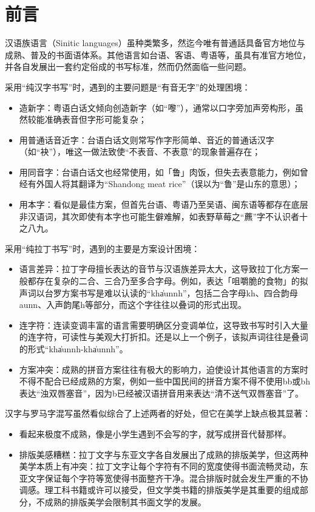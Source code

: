\section*{前言}
汉语族语言（Sinitic languages）虽种类繁多，然迄今唯有普通話具备官方地位与成熟、普及的书面语体系。其他语言如台语、客语、粤语等，虽具有准官方地位，并各自发展出一套约定俗成的书写标准，然而仍然面临一些问题。\par
采用“纯汉字书写”时，遇到的主要问题是“有音无字”的处理困境：\par
\begin{itemize}
	\item 造新字：粤语白话文倾向创造新字（如“嚟”），通常以口字旁加声旁构形，虽然较能准确表音但字形可能复杂；
	\item 用普通话音近字：台语白话文则常写作字形简单、音近的普通话汉字（如“袂”），唯这一做法致使“不表音、不表意”的现象普遍存在；
	\item 用同音字：台语白话文也经常使用，如「鲁」肉饭，但失去表意能力，例如曾经有外国人将其翻译为“Shandong meat rice”（误以为“鲁”是山东的意思）；
	\item 用本字：看似是最佳方案，但首先台语、粤语乃至吴语、闽东语等都存在底层非汉语词，其次即使有本字也可能生僻难解，如表野草莓之“藨”字不认识者十之八九。
\end{itemize}
采用“纯拉丁书写”时，遇到的主要是方案设计困境：\par
\begin{itemize}
	\item 语言差异：拉丁字母擅长表达的音节与汉语族差异太大，这导致拉丁化方案一般都存在复杂的二合、三合乃至多合字母。例如，表达「咀嚼脆的食物」的拟声词以台罗方案书写是难以认读的“kha̍unnh”，包括二合字母kh、四合韵母aunn、入声韵尾h等部分，而这个字往往以叠词的形式出现。
	\item 连字符：连读变调丰富的语言需要明确区分变调单位，这导致书写时引入大量的连字符，可读性与美观大打折扣。还是以上一个例子，该拟声词往往是叠词的形式“kha̍unnh-kha̍unnh”。
	\item 方案冲突：成熟的拼音方案往往有极大的影响力，迫使设计其他语言的方案时不得不配合已经成熟的方案，例如一些中国民间的拼音方案不得不使用bb或bh表达“浊双唇塞音”，因为b已经被汉语拼音用来表达“清不送气双唇塞音”了。
\end{itemize}

汉字与罗马字混写虽然看似综合了上述两者的好处，但它在美学上缺点极其显著：
\begin{itemize}
	\item 看起来极度不成熟，像是小学生遇到不会写的字，就写成拼音代替那样。
	\item 排版美感糟糕：拉丁文字与东亚文字各自发展出了成熟的排版美学，但这两种美学本质上有冲突：拉丁文字让每个字符有不同的宽度使得书面流畅灵动，东亚文字保证每个字符等宽使得书面整齐干净。混合排版时就会发生严重的不协调感。理工科书籍或许可以接受，但文学类书籍的排版美学是其重要的组成部分，不成熟的排版美学会限制其书面文学的发展。
\end{itemize}

